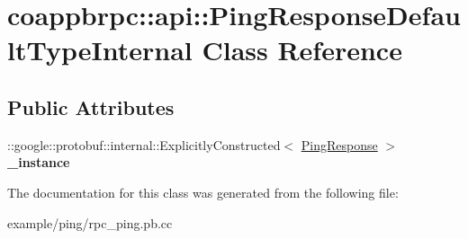 \hypertarget{classcoappbrpc_1_1api_1_1PingResponseDefaultTypeInternal}{}\section{coappbrpc\+:\+:api\+:\+:Ping\+Response\+Default\+Type\+Internal Class Reference}
\label{classcoappbrpc_1_1api_1_1PingResponseDefaultTypeInternal}
\subsection*{Public Attributes}
\begin{DoxyCompactItemize}
\item 
\mbox{\label{classcoappbrpc_1_1api_1_1PingResponseDefaultTypeInternal_adba2764ee5fe3999bb1da42616026252}} 
\+::google\+::protobuf\+::internal\+::\+Explicitly\+Constructed$<$ \hyperlink{classcoappbrpc_1_1api_1_1PingResponse}{Ping\+Response} $>$ {\bfseries \+\_\+instance}
\end{DoxyCompactItemize}


The documentation for this class was generated from the following file\+:\begin{DoxyCompactItemize}
\item 
example/ping/rpc\+\_\+ping.\+pb.\+cc\end{DoxyCompactItemize}
